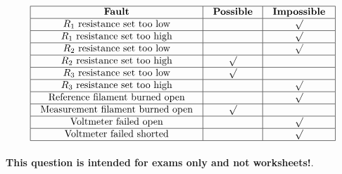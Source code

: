 






$$\vbox{\offinterlineskip
\halign{\strut
\vrule \quad\hfil # \ \hfil & 
\vrule \quad\hfil # \ \hfil & 
\vrule \quad\hfil # \ \hfil \vrule \cr
\noalign{\hrule}
%
{\bf Fault} & {\bf Possible} & {\bf Impossible} \cr
%
\noalign{\hrule}
%
$R_1$ resistance set too low &  & $\surd$ \cr
%
\noalign{\hrule}
%
$R_1$ resistance set too high &  & $\surd$ \cr
%
\noalign{\hrule}
%
$R_2$ resistance set too low &  & $\surd$ \cr
%
\noalign{\hrule}
%
$R_2$ resistance set too high & $\surd$ &  \cr
%
\noalign{\hrule}
%
$R_3$ resistance set too low & $\surd$ &  \cr
%
\noalign{\hrule}
%
$R_3$ resistance set too high &  & $\surd$ \cr
%
\noalign{\hrule}
%
Reference filament burned open &  & $\surd$ \cr
%
\noalign{\hrule}
%
Measurement filament burned open & $\surd$ &  \cr
%
\noalign{\hrule}
%
Voltmeter failed open &  & $\surd$ \cr
%
\noalign{\hrule}
%
Voltmeter failed shorted &  & $\surd$ \cr
%
\noalign{\hrule}
} %
}$$ %







{\bf This question is intended for exams only and not worksheets!}.




